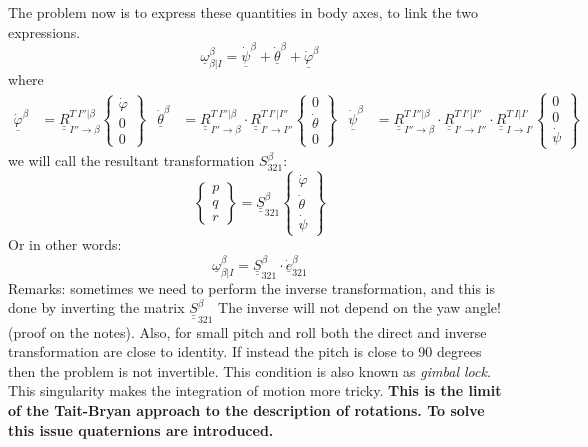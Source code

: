 The problem now is to express these quantities in body axes, to link the two expressions.
\begin{equation}
    \underline{\omega}_{\beta|I}^\beta = \underline{\dot \psi}^\beta + \underline{\dot \theta}^\beta + \underline{\dot \varphi}^\beta
\end{equation}
where
\begin{align}
    \underline{\dot \varphi}^\beta &= \underline{\underline{R}}_{I''\to \beta}^{T~I''|\beta}\begin{Bmatrix}
        \dot \varphi \\ 0 \\ 0
    \end{Bmatrix} &
    \underline{\dot \theta}^\beta &= \underline{\underline{R}}_{I''\to \beta}^{T~I''|\beta}\cdot \underline{\underline{R}}_{I'\to I''}^{T~I'|I''}\begin{Bmatrix}
        0 \\ \dot \theta \\ 0
    \end{Bmatrix}&
    \underline{\dot \psi}^\beta &= \underline{\underline{R}}_{I''\to \beta}^{T~I''|\beta}\cdot \underline{\underline{R}}_{I'\to I''}^{T~I'|I''}\cdot \underline{\underline{R}}_{I\to I'}^{T~I|I'}\begin{Bmatrix}
        0 \\ 0 \\ \dot \psi
    \end{Bmatrix}
\end{align}
we will call the resultant transformation $S_{321}^\beta$:
\begin{equation}
   \begin{Bmatrix}
        p\\q\\r
    \end{Bmatrix} = \underline{\underline{S}}_{321}^\beta \begin{Bmatrix}
        \dot \varphi\\
        \dot \theta\\
        \dot \psi
    \end{Bmatrix}
\end{equation}
Or in other words:
\begin{equation}    
\label{eq: omega to euler rates}
\boxed{\underline{\omega}_{\beta|I}^\beta = \underline{\underline{S}}_{321}^\beta \cdot \underline{\dot e}_{321}^\beta}
\end{equation}
Remarks: sometimes we need to perform the inverse transformation, and this is done by inverting the matrix $\underline{\underline{S}}_{321}^\beta$
The inverse will not depend on the yaw angle! (proof on the notes). Also, for small pitch and roll both the direct and inverse transformation are close to identity. If instead the pitch is close to 90 degrees then the problem is not invertible. This condition is also known as \textit{gimbal lock}. This singularity makes the integration of motion more tricky. \textbf{This is the limit of the Tait-Bryan approach to the description of rotations. To solve this issue quaternions are introduced.}

